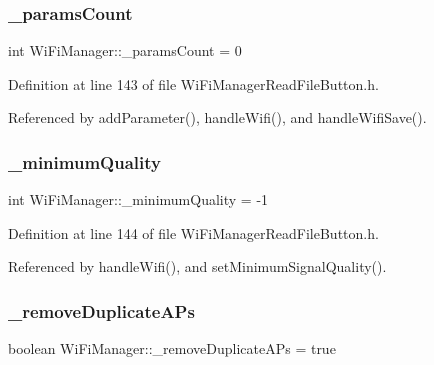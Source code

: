 \subsubsection{\texorpdfstring{\+\_\+params\+Count}{\_paramsCount}}
{\footnotesize\ttfamily int Wi\+Fi\+Manager\+::\+\_\+params\+Count = 0\hspace{0.3cm}{\ttfamily [private]}}



Definition at line 143 of file Wi\+Fi\+Manager\+Read\+File\+Button.\+h.



Referenced by add\+Parameter(), handle\+Wifi(), and handle\+Wifi\+Save().

\mbox{\label{class_wi_fi_manager_ad1e130a5ce502767de764ea0cb1cecf6}} 
\subsubsection{\texorpdfstring{\+\_\+minimum\+Quality}{\_minimumQuality}}
{\footnotesize\ttfamily int Wi\+Fi\+Manager\+::\+\_\+minimum\+Quality = -\/1\hspace{0.3cm}{\ttfamily [private]}}



Definition at line 144 of file Wi\+Fi\+Manager\+Read\+File\+Button.\+h.



Referenced by handle\+Wifi(), and set\+Minimum\+Signal\+Quality().

\mbox{\label{class_wi_fi_manager_a94d25bd8d02bbf0236d75dfd8ee682d7}} 
\subsubsection{\texorpdfstring{\+\_\+remove\+Duplicate\+A\+Ps}{\_removeDuplicateAPs}}
{\footnotesize\ttfamily boolean Wi\+Fi\+Manager\+::\+\_\+remove\+Duplicate\+A\+Ps = true\hspace{0.3cm}{\ttfamily [private]}}



